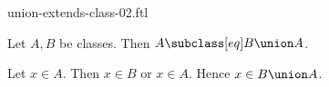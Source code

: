 \documentclass{article}
\begin{document}
\begin{smodule}[creators={Marcel Schütz}]{union-extends-class-02.ftl}

  \begin{fproposition*}[label=8894188219269120]
    Let $A, B$ be classes.
    Then $A \subclass[eq] B \union A$.
  \end{fproposition*}
  \begin{fproof}
    Let $x \in A$.
    Then $x \in B$ or $x \in A$.
    Hence $x \in B \union A$.
  \end{fproof}
\end{smodule}
\end{document}

